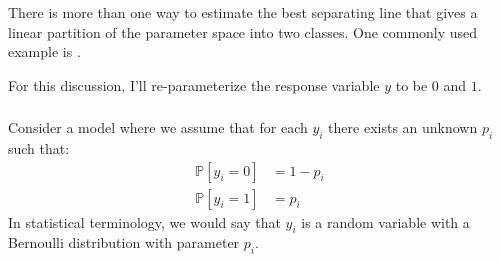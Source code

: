 \documentclass[xetex,mathserif,serif,aspectratio=169]{beamer}
\begin{document}
{
\begin{frame}[plain]
\end{frame}
}

\begin{frame}[fragile] \frametitle{} \oldB \small

\textbf{}

There is more than one way to estimate the best separating line that gives a
linear partition of the parameter space into two classes. One commonly used
example is .

For this discussion, I'll re-parameterize the response variable $y$ to be
$0$ and $1$.

\end{frame}

\begin{frame}[fragile] \frametitle{} \oldB \small

\textbf{}

Consider a model where we assume that for each $y_i$ there exists an unknown
$p_i$ such that:
\begin{align}
\mathbb{P} \left[ y_i = 0 \right] &= 1 - p_i \\
\mathbb{P} \left[ y_i = 1 \right] &= p_i
\end{align}
In statistical terminology, we would say that $y_i$ is a random variable with
a Bernoulli distribution with parameter $p_i$.

\end{frame}
\end{document}

